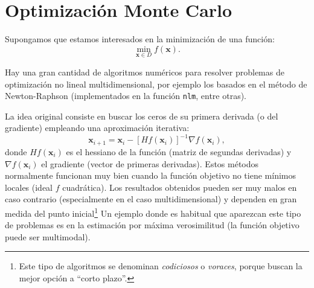 \documentclass[
  10pt,
]{book}
\renewcommand{\mathbf}[1]{\symbf{#1}}
\theoremstyle{break}
\theoremstyle{nonumberplain}
\let\oldfootnote\footnote
\renewcommand\footnote[1]{\oldfootnote{\hspace{2mm}#1}}
\begin{document}
\hypertarget{opt-MC}{%
\section{Optimización Monte Carlo}\label{opt-MC}}

Supongamos que estamos interesados en la minimización de una función:
\[\underset{\mathbf{x}\in D}{\min }f(\mathbf{x}).\]

Hay una gran cantidad de algoritmos numéricos para resolver problemas de optimización no lineal multidimensional, por ejemplo los basados en el método de Newton-Raphson (implementados en la función \texttt{nlm}, entre otras).

La idea original consiste en buscar los ceros de su primera derivada (o del gradiente) empleando una aproximación iterativa:
\[\mathbf{x}_{i+1} = \mathbf{x}_i-[Hf(\mathbf{x}_i)]^{-1}\nabla f(\mathbf{x}_i),\]
donde \(Hf(\mathbf{x}_i)\) es el hessiano de la función (matriz de segundas derivadas) y \(\nabla f(\mathbf{x}_i)\) el gradiente (vector de primeras derivadas).
Estos métodos normalmente funcionan muy bien cuando la función objetivo no tiene mínimos locales (ideal \(f\) cuadrática).
Los resultados obtenidos pueden ser muy malos en caso contrario (especialmente en el caso multidimensional) y dependen en gran medida del punto inicial\footnote{Este tipo de algoritmos se denominan \emph{codiciosos} o \emph{voraces}, porque buscan la mejor opción a ``corto plazo''.}
Un ejemplo donde es habitual que aparezcan este tipo de problemas es en la estimación por máxima verosimilitud (la función objetivo puede ser multimodal).
\end{document}
